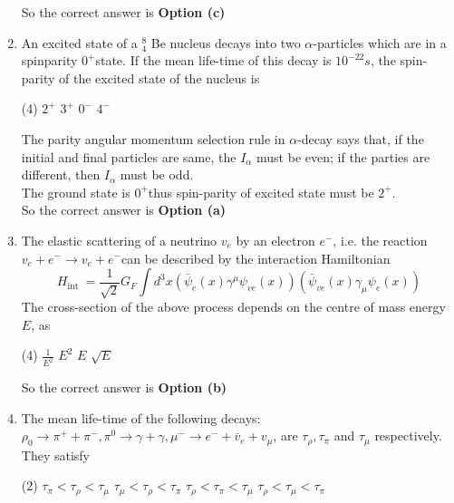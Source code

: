 \begin{enumerate}
\begin{answer}
	So the correct answer is \textbf{Option (c)}
\end{answer}
\item An excited state of a ${ }_{4}^{8}$ Be nucleus decays into two $\alpha$-particles which are in a spinparity $0^{+}$state. If the mean life-time of this decay is $10^{-22} s$, the spin-parity of the excited state of the nucleus is
 \begin{tasks}(4)
	\task[\textbf{a.}]$2^{+}$
	\task[\textbf{b.}]$3^{+}$
	\task[\textbf{c.}]$0^{-}$
	\task[\textbf{d.}]$4^{-}$ 
\end{tasks}
\begin{answer}
 The parity angular momentum selection rule in $\alpha$-decay says that, if the initial and final particles are same, the $I_{\alpha}$ must be even; if the parties are different, then $I_{\alpha}$ must be odd.\\
The ground state is $0^{+}$thus spin-parity of excited state must be $2^{+}$.\\
So the correct answer is \textbf{Option (a)}
\end{answer}
\item The elastic scattering of a neutrino $v_{e}$ by an electron $e^{-}$, i.e. the reaction $v_{e}+e^{-} \rightarrow v_{e}+e^{-}$can be described by the interaction Hamiltonian
$$
H_{\text {int }}=\frac{1}{\sqrt{2}} G_{F} \int d^{3} x\left(\bar{\psi}_{e}(x) \gamma^{\mu} \psi_{v e}(x)\right)\left(\bar{\psi}_{v e}(x) \gamma_{\mu} \psi_{e}(x)\right)
$$
The cross-section of the above process depends on the centre of mass energy $E$, as
 \begin{tasks}(4)
	\task[\textbf{a.}]$\frac{1}{E^{2}}$
	\task[\textbf{b.}]$E^{2}$
	\task[\textbf{c.}]$E$
	\task[\textbf{d.}]$\sqrt{E}$ 
\end{tasks}
\begin{answer}
	So the correct answer is \textbf{Option (b)}
\end{answer}
\item  The mean life-time of the following decays:\\
$\rho_{0} \rightarrow \pi^{+}+\pi^{-}, \pi^{0} \rightarrow \gamma+\gamma, \mu^{-} \rightarrow e^{-}+\bar{v}_{e}+v_{\mu}$, are $\tau_{\rho}, \tau_{\pi}$ and $\tau_{\mu}$ respectively.
They satisfy
 \begin{tasks}(2)
	\task[\textbf{a.}]$\tau_{\pi}<\tau_{\rho}<\tau_{\mu}$
	\task[\textbf{b.}]$\tau_{\mu}<\tau_{\rho}<\tau_{\pi}$
	\task[\textbf{c.}]$\tau_{\rho}<\tau_{\pi}<\tau_{\mu}$
	\task[\textbf{d.}]$\tau_{\rho}<\tau_{\mu}<\tau_{\pi}$ 
\end{tasks}

\end{enumerate}
